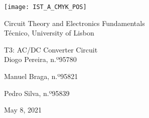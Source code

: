 
\thispagestyle {empty}

\texttt{[image: IST\_A\_CMYK\_POS]}

\begin{center}
%
\vspace{1.0cm}

\vspace{1cm}
{\FontLb Circuit Theory and Electronics Fundamentals} \\ %
\vspace{1cm}
{\FontSn Técnico, University of Lisbon} \\ %
\vspace{1cm}

{\FontSn T3: AC/DC Converter Circuit} \\
\vspace{1cm}
{\FontSn Diogo Pereira, n.º95780}
\par{\FontSn Manuel Braga, n.º95821}
\par{\FontSn Pedro Silva, n.º95839}
\vspace{1.0cm}
\par{\FontSn May 8, 2021} \\ %
%
\end{center}

